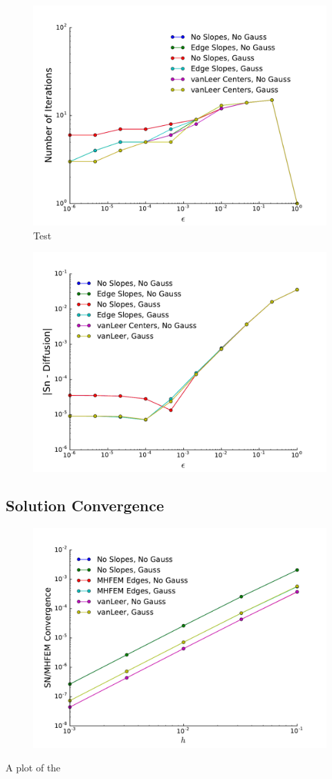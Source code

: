 \begin{figure} \centering
	\includegraphics[width=5in]{figs/diffLimit.pdf}
	\caption{Test}
	\label{fig:diffLim_iterations}
\end{figure}
\begin{figure} \centering
	\includegraphics[width=6in]{figs/diffError.pdf}
	\caption{}
	\label{fig:diffLim_error}
\end{figure}

\subsection{Solution Convergence}
\begin{figure} \centering
	\includegraphics[width=6in]{figs/hlimit.pdf}
	\caption{}
	\label{fig:hlimit}
\end{figure}
A plot of the 

